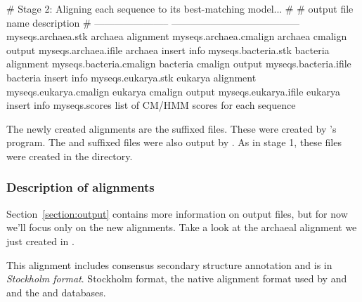 \begin{sreoutput}
# Stage 2: Aligning each sequence to its best-matching model...
#
# output file name         description
# -----------------------  ---------------------------------------
  myseqs.archaea.stk       archaea alignment
  myseqs.archaea.cmalign   archaea cmalign output
  myseqs.archaea.ifile     archaea insert info
  myseqs.bacteria.stk      bacteria alignment
  myseqs.bacteria.cmalign  bacteria cmalign output
  myseqs.bacteria.ifile    bacteria insert info
  myseqs.eukarya.stk       eukarya alignment
  myseqs.eukarya.cmalign   eukarya cmalign output
  myseqs.eukarya.ifile     eukarya insert info
  myseqs.scores            list of CM/HMM scores for each sequence
\end{sreoutput}

The newly created alignments are the  suffixed files. These
were created by 's  program. The
 and  suffixed files were also output by
. As in stage 1, these files were created in the
 directory. 

\subsubsection{Description of alignments}

Section~\ref{section:output} contains more information
on  output files, but for now we'll focus only on the new
alignments.  Take a look at the archaeal alignment we just created in
.

This alignment includes consensus secondary structure annotation and
is in \emph{Stockholm format}. 
Stockholm format, the native alignment format used by  and
 and the  and 
databases.

